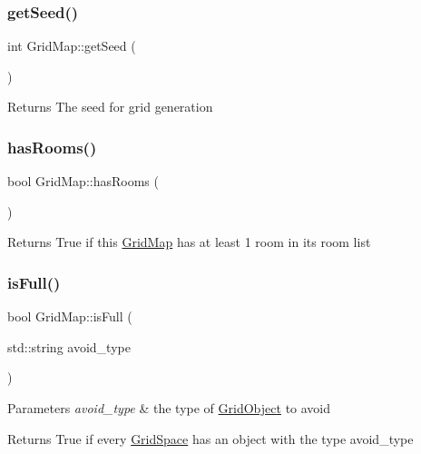 \subsubsection{\texorpdfstring{get\+Seed()}{getSeed()}}
{\footnotesize\ttfamily int Grid\+Map\+::get\+Seed (\begin{DoxyParamCaption}{ }\end{DoxyParamCaption})}

\begin{DoxyReturn}{Returns}
The seed for grid generation 
\end{DoxyReturn}
\mbox{\label{classGridMap_a95c42d50d66b1c391cc3ed6b0d1df216}} 
\subsubsection{\texorpdfstring{has\+Rooms()}{hasRooms()}}
{\footnotesize\ttfamily bool Grid\+Map\+::has\+Rooms (\begin{DoxyParamCaption}{ }\end{DoxyParamCaption})}

\begin{DoxyReturn}{Returns}
True if this \hyperlink{classGridMap}{Grid\+Map} has at least 1 room in its room list 
\end{DoxyReturn}
\mbox{\label{classGridMap_a7413b5a887d323f9bda82e1fa036ffaf}} 
\subsubsection{\texorpdfstring{is\+Full()}{isFull()}}
{\footnotesize\ttfamily bool Grid\+Map\+::is\+Full (\begin{DoxyParamCaption}\item[{std\+::string}]{avoid\+\_\+type }\end{DoxyParamCaption})}


\begin{DoxyParams}{Parameters}
{\em avoid\+\_\+type} & the type of \hyperlink{classGridObject}{Grid\+Object} to avoid \\
\hline
\end{DoxyParams}
\begin{DoxyReturn}{Returns}
True if every \hyperlink{classGridSpace}{Grid\+Space} has an object with the type avoid\+\_\+type 
\end{DoxyReturn}
\mbox{\label{classGridMap_ad2a74670b88ffbe198080f4bfa23723d}} 
